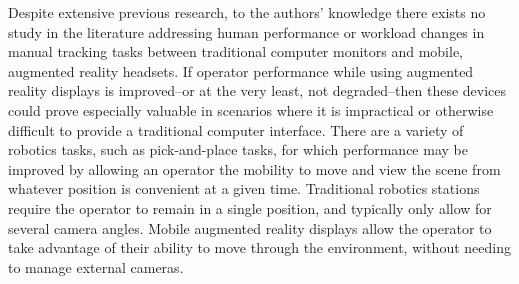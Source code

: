 \documentclass[float=false, crop=false]{standalone}
\begin{document}
Despite extensive previous research, to the authors' knowledge there exists no study in the literature addressing human performance or workload changes in manual tracking tasks between traditional computer monitors and mobile, augmented reality headsets.
If operator performance while using augmented reality displays is improved--or at the very least, not degraded--then these devices could prove especially valuable in scenarios where it is impractical or otherwise difficult to provide a traditional computer interface.
There are a variety of robotics tasks, such as pick-and-place tasks, for which performance may be improved by allowing an operator the mobility to move and view the scene from whatever position is convenient at a given time.
Traditional robotics stations require the operator to remain in a single position, and typically only allow for several camera angles.
Mobile augmented reality displays allow the operator to take advantage of their ability to move through the environment, without needing to manage external cameras.
\end{document}
